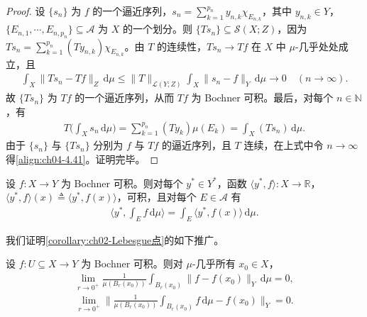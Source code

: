 \documentclass[../../main.tex]{subfiles}%
\begin{document}
\begin{proof}
设 $\{s_n\}$ 为 $f$ 的一个逼近序列，$s_n=\sum_{k=1}^{p_n}y_{n,k}\chi_{E_{n,k}}$，其中 $y_{n,k}\in Y$，$\{E_{n,1},\cdots ,E_{n,p_n}\}\subseteq\mathcal{A}$ 为 $X$ 的一个划分。则 $\{Ts_n\}\subseteq\mathcal{S}(X;Z)$，因为 $Ts_n=\sum_{k=1}^{p_n}(Ty_{n,k})\chi_{E_{n,k}}$。由 $T$ 的连续性，$Ts_n\to Tf$ 在 $X$ 中 $\mu$-几乎处处成立，且
\begin{align*}
\int_X\|Ts_n-Tf\|_Z\,\mathrm{d}\mu\leqslant\|T\|_{\mathcal{L}(Y;Z)}\int_X\|s_n-f\|_Y\,\mathrm{d}\mu\to0\quad(n\to\infty).
\end{align*}
故 $\{Ts_n\}$ 为 $Tf$ 的一个逼近序列，从而 $Tf$ 为 Bochner 可积。最后，对每个 $n\in\mathbb{N}$，有
\begin{align*}
T\Big(\int_X s_n\,\mathrm{d}\mu\Big)=\sum_{k=1}^{p_n}(Ty_k)\mu(E_k)=\int_X(Ts_n)\,\mathrm{d}\mu.
\end{align*}
由于 $\{s_n\}$ 与 $\{Ts_n\}$ 分别为 $f$ 与 $Tf$ 的逼近序列，且 $T$ 连续，在上式中令 $n\to\infty$ 得\eqref{align:ch04-4.41}。证明完毕。
\end{proof}

\begin{corollary}\label{corollary:ch04-对偶配对}
设 $f:X\to Y$ 为 Bochner 可积。则对每个 $y^*\in Y^*$，函数 $\langle y^*,f\rangle:X\to\mathbb{R}$，$\langle y^*,f\rangle(x)\triangleq \langle y^*,f(x)\rangle$，可积，且对每个 $E\in\mathcal{A}$ 有
\begin{align}
\Big\langle y^*,\int_E f\,\mathrm{d}\mu\Big\rangle=\int_E\langle y^*,f(x)\rangle\,\mathrm{d}\mu. \label{align:ch04-4.42}
\end{align}
\end{corollary}

我们证明\cref{corollary:ch02-Lebesgue点}的如下推广。

\begin{proposition}\label{proposition:ch04-Lebesgue点}
设 $f:U\subseteq X\to Y$ 为 Bochner 可积。则对 $\mu$-几乎所有 $x_0\in X$，
\begin{align}
\lim_{r\to0^+}\frac1{\mu(B_r(x_0))}\int_{B_r(x_0)}\|f-f(x_0)\|_Y\,\mathrm{d}\mu=0, \label{align:ch04-4.43a}
\end{align}
\begin{align}
\lim_{r\to0^+}\Big\|\frac1{\mu(B_r(x_0))}\int_{B_r(x_0)}f\,\mathrm{d}\mu-f(x_0)\Big\|_Y=0. \label{align:ch04-4.43b}
\end{align}
\end{proposition}
\end{document}
